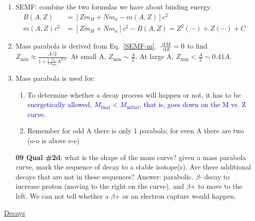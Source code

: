 \documentclass{school-22.101-notes}
\begin{document}
\begin{enumerate}
\item SEMF: combine the two formulas we have about binding energy. 
\begin{align}
B(A,Z) &= \left[ Z m_H + N m_n - m(A,Z) \right] c^2  \label{BAZ}\\
m(A,Z) c^2 &= \left[ Z m_H + N m_n \right] c^2 - B(A,Z) = Z^2 (\cdots) + Z(\cdots) + C \label{SEMF-m}
\end{align}

\item Mass parabola is derived from Eq.~\ref{SEMF-m}. $\frac{\mbox{ }\mathrm{d} M}{\mbox{ }\mathrm{d} Z} = 0$ to find $\displaystyle Z_{\mathrm{min}} \approx \frac{A/2}{1 + \frac{1}{4} \frac{a_c}{a_{\mathrm{sym}}} A^{3/4}} $. At small A, $Z_{\mathrm{min}} \sim \frac{A}{2}$. At large A, $Z_{\mathrm{min}} < \frac{A}{2} \sim 0.41 A$. 

\item Mass parabola is used for: 
    \begin{enumerate}
    \item To determine whether a decay process will happen or not, it has to be \textcolor{blue}{energetically allowed, $M_{\mathrm{final}} < M_{\mathrm{initial}}$, that is, goes down on the M vs. Z curve.}
    \item Remember for odd A there is only 1 parabola; for even A there are two (o-o is above e-e)
    \end{enumerate}
\textbf{09 Qual \#2d}: what is the shape of the mass curve? given a mass parabola curve, mark the sequence of decay to a stable isotope(s). Are there additional decays that are not in these sequences? Answer: parabolic. $\beta$- decay to increase proton (moving to the right on the curve), and $\beta$+ to move to the left. We can not tell whether a $\beta$+ or an electron capture would happen. 
\end{enumerate}

\uline{Decays}
\end{document}
